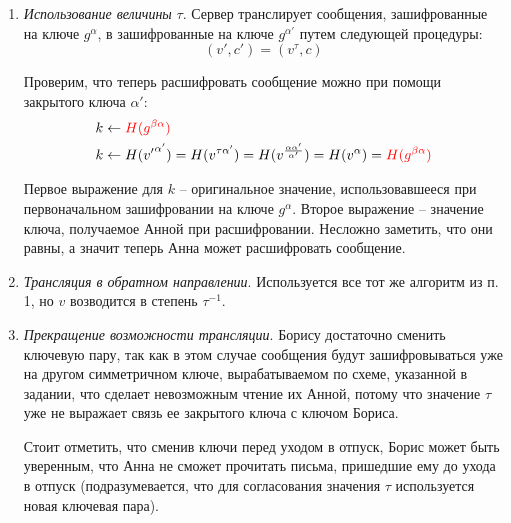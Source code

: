 \documentclass[12pt, a4paper]{extarticle}
\begin{document}
\begin{enumerate}
    \item \textit{Использование величины} $\tau$. Сервер транслирует сообщения, зашифрованные на ключе
        $g^{\alpha}$, в зашифрованные на ключе $g^{\alpha'}$ путем следующей процедуры:
        \begin{equation*}
            (v', c') = (v^{\tau}, c)
        \end{equation*}
        
        Проверим, что теперь расшифровать сообщение можно при помощи закрытого ключа $\alpha'$:
        \begin{equation*}
            \begin{split}
                & k \leftarrow \textcolor{red}{H(g^{\beta \alpha})} \\
                & k \leftarrow H({v'}^{\alpha'}) = H(v^{\tau \alpha'}) = H(v^{\frac{\alpha 
                    \alpha'}{\alpha'}}) = H(v^{\alpha}) = \textcolor{red}{H(g^{\beta \alpha})}
            \end{split}
        \end{equation*}
        
        Первое выражение для $k$ -- оригинальное значение, использовавшееся при первоначальном
        зашифровании на ключе $g^{\alpha}$. Второе выражение -- значение ключа, получаемое Анной
        при расшифровании. Несложно заметить, что они равны, а значит теперь Анна может
        расшифровать сообщение.
        
    \item \textit{Трансляция в обратном направлении}. Используется все тот же алгоритм из п. 1,
        но $v$ возводится в степень $\tau^{-1}$.
        
    \item \textit{Прекращение возможности трансляции}. Борису достаточно сменить ключевую пару,
        так как в этом случае сообщения будут зашифровываться уже на другом симметричном ключе,
        вырабатываемом по схеме, указанной в задании, что сделает невозможным чтение их Анной,
        потому что значение $\tau$ уже не выражает связь ее закрытого ключа с ключом Бориса.
        
        Стоит отметить, что сменив ключи перед уходом в отпуск, Борис может быть уверенным, что
        Анна не сможет прочитать письма, пришедшие ему до ухода в отпуск (подразумевается, что
        для согласования значения $\tau$ используется новая ключевая пара).
\end{enumerate}
\end{document}
